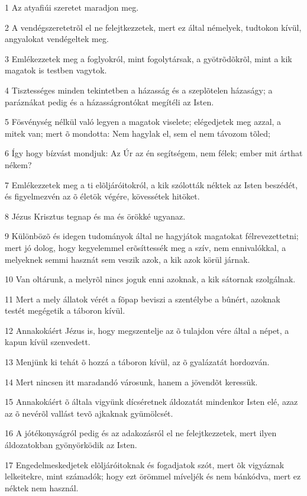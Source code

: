 \par 1 Az atyafiúi szeretet maradjon meg.
\par 2 A vendégszeretetrõl el ne felejtkezzetek, mert ez által némelyek, tudtokon kívül, angyalokat vendégeltek meg.
\par 3 Emlékezzetek meg a foglyokról, mint fogolytársak, a gyötrõdõkrõl, mint a kik magatok is testben vagytok.
\par 4 Tisztességes minden tekintetben a házasság és a szeplõtelen házaságy; a paráznákat pedig és a házasságrontókat megítéli az Isten.
\par 5 Fösvénység nélkül való legyen a magatok viselete; elégedjetek meg azzal, a mitek van; mert õ mondotta: Nem hagylak el,  sem el nem távozom tõled;
\par 6 Így hogy bízvást mondjuk: Az Úr az én segítségem, nem félek; ember mit árthat nékem?
\par 7 Emlékezzetek meg a ti elõljáróitokról, a kik szólották néktek az Isten beszédét, és figyelmezvén az õ életök végére, kövessétek hitöket.
\par 8 Jézus Krisztus tegnap és ma és örökké ugyanaz.
\par 9 Különbözõ és idegen tudományok által ne hagyjátok magatokat félrevezettetni; mert jó dolog, hogy kegyelemmel erõsíttessék meg a szív, nem ennivalókkal, a melyeknek semmi hasznát sem veszik azok, a kik azok körül járnak.
\par 10 Van oltárunk, a melyrõl nincs joguk enni azoknak, a kik sátornak szolgálnak.
\par 11 Mert a mely állatok vérét a fõpap beviszi a szentélybe a bûnért, azoknak testét megégetik a táboron kívül.
\par 12 Annakokáért Jézus is, hogy megszentelje az õ tulajdon vére által a népet, a kapun kívül szenvedett.
\par 13 Menjünk ki tehát õ hozzá a táboron kívül, az õ gyalázatát hordozván.
\par 14 Mert nincsen itt maradandó városunk, hanem a jövendõt keressük.
\par 15 Annakokáért õ általa vigyünk dícséretnek áldozatát mindenkor Isten elé, azaz az õ nevérõl vallást tevõ ajkaknak gyümölcsét.
\par 16 A jótékonyságról pedig és az adakozásról el ne felejtkezzetek, mert ilyen áldozatokban gyönyörködik az Isten.
\par 17 Engedelmeskedjetek elõljáróitoknak és fogadjatok szót, mert õk vigyáznak lelkeitekre,  mint számadók; hogy ezt örömmel míveljék és nem bánkódva, mert ez néktek nem használ.
